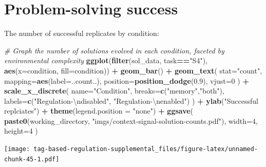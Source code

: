 \documentclass[
]{book}
\newenvironment{Shaded}{\begin{snugshade}}{\end{snugshade}}
\newcommand{\CharTok}[1]{\textcolor[rgb]{0.31,0.60,0.02}{#1}}
\newcommand{\CommentTok}[1]{\textcolor[rgb]{0.56,0.35,0.01}{\textit{#1}}}
\newcommand{\DataTypeTok}[1]{\textcolor[rgb]{0.13,0.29,0.53}{#1}}
\newcommand{\DecValTok}[1]{\textcolor[rgb]{0.00,0.00,0.81}{#1}}
\newcommand{\FloatTok}[1]{\textcolor[rgb]{0.00,0.00,0.81}{#1}}
\newcommand{\KeywordTok}[1]{\textcolor[rgb]{0.13,0.29,0.53}{\textbf{#1}}}
\newcommand{\NormalTok}[1]{#1}
\newcommand{\OperatorTok}[1]{\textcolor[rgb]{0.81,0.36,0.00}{\textbf{#1}}}
\newcommand{\StringTok}[1]{\textcolor[rgb]{0.31,0.60,0.02}{#1}}
\begin{document}
\hypertarget{problem-solving-success-1}{%
\section{Problem-solving success}\label{problem-solving-success-1}}

The number of successful replicates by condition:

\begin{Shaded}
\begin{Highlighting}[]
\CommentTok{\# Graph the number of solutions evolved in each condition, faceted by environmental complexity}
\KeywordTok{ggplot}\NormalTok{(}\KeywordTok{filter}\NormalTok{(sol\_data, task}\OperatorTok{==}\StringTok{"S4"}\NormalTok{), }\KeywordTok{aes}\NormalTok{(}\DataTypeTok{x=}\NormalTok{condition, }\DataTypeTok{fill=}\NormalTok{condition)) }\OperatorTok{+}
\StringTok{  }\KeywordTok{geom\_bar}\NormalTok{() }\OperatorTok{+}
\StringTok{  }\KeywordTok{geom\_text}\NormalTok{(}
    \DataTypeTok{stat=}\StringTok{"count"}\NormalTok{,}
    \DataTypeTok{mapping=}\KeywordTok{aes}\NormalTok{(}\DataTypeTok{label=}\NormalTok{..count..),}
    \DataTypeTok{position=}\KeywordTok{position\_dodge}\NormalTok{(}\FloatTok{0.9}\NormalTok{),}
    \DataTypeTok{vjust=}\DecValTok{0}
\NormalTok{  ) }\OperatorTok{+}
\StringTok{  }\KeywordTok{scale\_x\_discrete}\NormalTok{(}
    \DataTypeTok{name=}\StringTok{"Condition"}\NormalTok{,}
    \DataTypeTok{breaks=}\KeywordTok{c}\NormalTok{(}\StringTok{"memory"}\NormalTok{,}\StringTok{"both"}\NormalTok{),}
    \DataTypeTok{labels=}\KeywordTok{c}\NormalTok{(}\StringTok{"Regulation{-}}\CharTok{\textbackslash{}n}\StringTok{disabled"}\NormalTok{, }\StringTok{"Regulation{-}}\CharTok{\textbackslash{}n}\StringTok{enabled"}\NormalTok{)}
\NormalTok{  ) }\OperatorTok{+}
\StringTok{  }\KeywordTok{ylab}\NormalTok{(}\StringTok{"Successful replciates"}\NormalTok{) }\OperatorTok{+}
\StringTok{  }\KeywordTok{theme}\NormalTok{(}\DataTypeTok{legend.position =} \StringTok{"none"}\NormalTok{) }\OperatorTok{+}
\StringTok{  }\KeywordTok{ggsave}\NormalTok{(}
    \KeywordTok{paste0}\NormalTok{(working\_directory, }\StringTok{"imgs/context{-}signal{-}solution{-}counts.pdf"}\NormalTok{),}
    \DataTypeTok{width=}\DecValTok{4}\NormalTok{,}
    \DataTypeTok{height=}\DecValTok{4}
\NormalTok{  )}
\end{Highlighting}
\end{Shaded}

\texttt{[image: tag-based-regulation-supplemental\_files/figure-latex/unnamed-chunk-45-1.pdf]}
\end{document}

